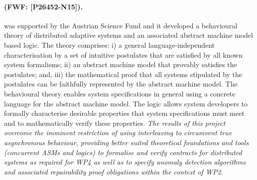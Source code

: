 \documentclass[a4paper,11pt]{article}
\newcommand{\project}[1]{\textbf{#1}\xspace}
\newcommand{\SECURITY}{\project{Elysian}}
\newcommand{\TheProject}{\SECURITY}
\begin{document}

\begin{mdframed}[backgroundcolor=blue!5]
\paragraph{\blogdas (FWF: [P26452-N15]).} 
\blogdas was supported by the Austrian Science Fund and it developed a behavioural theory of distributed adaptive systems and an associated abstract machine model based logic. The theory comprises: i) a general language-independent characterisation by a set of intuitive postulates that are satisfied by all known system formalisms; ii) an abstract machine model that provably satisfies the postulates; and, iii) the mathematical proof that all systems stipulated by the postulates can be faithfully represented by the abstract machine model. The behavioural theory enables system specifications in general using a concrete language for the abstract machine model. The logic allows system developers to formally characterise desirable properties that system specifications must meet and to mathematically verify these properties. %
\emph{The results of this project overcome the imminent restriction of using interleaving to circumvent true asynchronous behaviour, providing better suited theoretical foundations and tools (concurrent ASMs and logics) to formalise and verify contracts for distributed systems as required for WP4 as well as to specify anomaly detection algorithms and associated repairability proof obligations within the context of WP2.}  
\end{mdframed}
\end{document}
